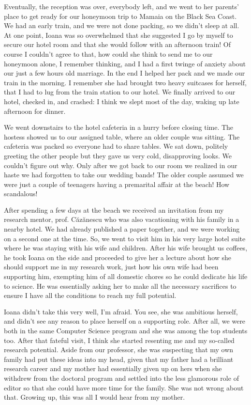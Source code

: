 \documentclass[12pt]{book}
\begin{document}
Eventually, the reception was over, everybody left, and we went to her
parents' place to get ready for our honeymoon trip to Mamaia on the
Black Sea Coast. We had an early train, and we were not done packing, so
we didn't sleep at all. At one point, Ioana was so overwhelmed that she
suggested I go by myself to secure our hotel room and that she would
follow with an afternoon train! Of course I couldn't agree to that, how
could she think to send me to our honeymoon alone, I remember thinking,
and I had a first twinge of anxiety about our just a few hours old
marriage. In the end I helped her pack and we made our train in the
morning. I remember she had brought two heavy suitcases for herself,
that I had to lug from the train station to our hotel. We finally
arrived to our hotel, checked in, and crashed: I think we slept most of
the day, waking up late afternoon for dinner.

We went downstairs to the hotel cafeteria in a hurry before closing
time. The hostess showed us to our assigned table, where an older couple
was sitting. The cafeteria was packed so everyone had to share tables.
We sat down, politely greeting the other people but they gave us very
cold, disapproving looks. We couldn't figure out why. Only after we got
back to our room we realized in our haste we had forgotten to take our
wedding bands! The older couple assumed we were just a couple of
teenagers having a premarital affair at the beach! How scandalous!

After spending a few days at the beach we received an invitation from my
research mentor, prof. Căzănescu who was also vacationing with his
family in a nearby hotel. We had already published a paper together, and
we were working on a second one at the time. So, we went to visit him in
his very large hotel suite where he was staying with his wife and
children. After his wife brought us coffees, he took Ioana on the side
and proceeded to give her a lecture about how she should support me in
my research work, just how his own wife had been supporting him,
exempting him of all domestic chores so he could dedicate his life to
science. He was essentially asking her to make all the necessary
sacrifices to ensure I have all the conditions to reach my full
potential.

Ioana didn't take this very well, I'm afraid. You see, she was ambitious
herself, and didn't see any reason to place herself on a supporting
role. After all, we were both in the same Computer Science program and
she was among the top students too. After that fateful visit, I think
she started resenting me and my so-called research potential. Aside from
our professor, she was suspecting that my own family had put these ideas
into my head, given that my father had a brilliant research career and
my mother had essentially given up on hers when she withdrew from the
doctoral program and settled into the less glamorous role of editor so
that she could have more time for the family. She was not wrong about
that. Growing up, this was all I would hear from my mother.
\end{document}
